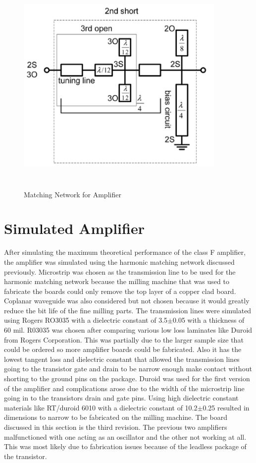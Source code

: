 \begin{figure}
  \centering
  \includegraphics[width=4in,height=4in,keepaspectratio]{figures/simulation/matching_network_woo}\\
  \caption{Matching Network for Amplifier} %
  \label{fig:matching_network_woo}
\end{figure}

\section{Simulated Amplifier}
After simulating the maximum theoretical performance of the class F amplifier, the amplifier was simulated using the harmonic matching network discussed previously. Microstrip was chosen as the transmission line to be used for the harmonic matching network because the milling machine that was used to fabricate the boards could only remove the top layer of a copper clad board. Coplanar waveguide was also considered but not chosen because it would greatly reduce the bit life of the fine milling parts. The transmission lines were simulated using Rogers RO3035 with a dielectric constant of 3.5$\pm$0.05 with a thickness of 60 mil. R03035 was chosen after comparing various low loss laminates like Duroid from Rogers Corporation. This was partially due to the larger sample size that could be ordered so more amplifier boards could be fabricated. Also it has the lowest tangent loss and dielectric constant that allowed the transmission lines going to the transistor gate and drain to be narrow enough make contact without shorting to the ground pins on the package. Duroid was used for the first version of the amplifier and complications arose due to the width of the microstrip line going in to the transistors drain and gate pins. Using high dielectric constant materials like RT/duroid 6010 with a dielectric constant of 10.2$\pm$0.25 resulted in dimensions to narrow to be fabricated on the milling machine. The board discussed in this section is the third revision. The previous two amplifiers malfunctioned with one acting as an oscillator and the other not working at all. This was most likely due to fabrication issues because of the leadless package of the transistor.

